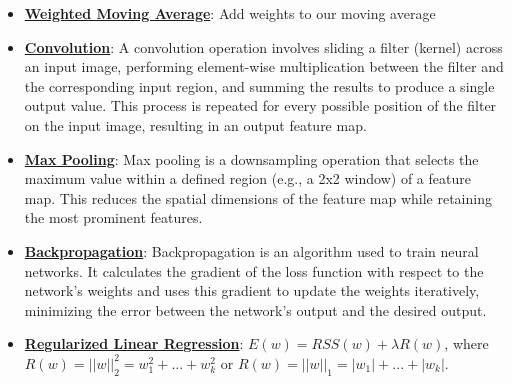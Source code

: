 \documentclass{article}%
\begin{document}
\begin{itemize}[leftmargin=*]
\item \href{https://purdue.brightspace.com/d2l/common/assets/pdfjs-d2l-dist/1.0.14-legacy/web/viewer.html?file=\%2Fcontent\%2Fenforced\%2F1095467-wl.202510.CS.24300.001\%2F07L2-Vision.pdf\%3Fou\%3D1095467\&lang=en-us\&container=d2l-fileviewer-rendered-pdf\&fullscreen=d2l-fileviewer-rendered-pdf-dialog\&height=667#page=40}{\textbf{Weighted Moving Average}}: Add weights to our moving average%
\item \href{https://purdue.brightspace.com/d2l/common/assets/pdfjs-d2l-dist/1.0.14-legacy/web/viewer.html?file=\%2Fcontent\%2Fenforced\%2F1095467-wl.202510.CS.24300.001\%2F09L1-cnn.pdf\%3Fou\%3D1095467\&lang=en-us\&container=d2l-fileviewer-rendered-pdf\&fullscreen=d2l-fileviewer-rendered-pdf-dialog\&height=667#page=6}{\textbf{Convolution}}: A convolution operation involves sliding a filter (kernel) across an input image, performing element-wise multiplication between the filter and the corresponding input region, and summing the results to produce a single output value. This process is repeated for every possible position of the filter on the input image, resulting in an output feature map.%
\item \href{https://purdue.brightspace.com/d2l/common/assets/pdfjs-d2l-dist/1.0.14-legacy/web/viewer.html?file=\%2Fcontent\%2Fenforced\%2F1095467-wl.202510.CS.24300.001\%2F09L1-cnn.pdf\%3Fou\%3D1095467\&lang=en-us\&container=d2l-fileviewer-rendered-pdf\&fullscreen=d2l-fileviewer-rendered-pdf-dialog\&height=667#page=14}{\textbf{Max Pooling}}: Max pooling is a downsampling operation that selects the maximum value within a defined region (e.g., a 2x2 window) of a feature map. This reduces the spatial dimensions of the feature map while retaining the most prominent features.%
\item \href{https://purdue.brightspace.com/d2l/common/assets/pdfjs-d2l-dist/1.0.14-legacy/web/viewer.html?file=\%2Fcontent\%2Fenforced\%2F1095467-wl.202510.CS.24300.001\%2F09L1-cnn.pdf\%3Fou\%3D1095467\&lang=en-us\&container=d2l-fileviewer-rendered-pdf\&fullscreen=d2l-fileviewer-rendered-pdf-dialog\&height=667#page=16}{\textbf{Backpropagation}}: Backpropagation is an algorithm used to train neural networks. It calculates the gradient of the loss function with respect to the network's weights and uses this gradient to update the weights iteratively, minimizing the error between the network's output and the desired output.%
\item \href{https://purdue.brightspace.com/d2l/common/assets/pdfjs-d2l-dist/1.0.14-legacy/web/viewer.html?file=\%2Fcontent\%2Fenforced\%2F1095467-wl.202510.CS.24300.001\%2F10L1-CrossValidation.pdf\%3Fou\%3D1095467\&lang=en-us\&container=d2l-fileviewer-rendered-pdf\&fullscreen=d2l-fileviewer-rendered-pdf-dialog\&height=667#page=17}{\textbf{Regularized Linear Regression}}: $E(w) = RSS(w) + \lambda R(w)$, where $R(w) = ||w||_2^2 = w_1^2 + ... + w_k^2$ or $R(w) = ||w||_1 = |w_1| + ... + |w_k|$.%

\end{itemize}
\end{document}
